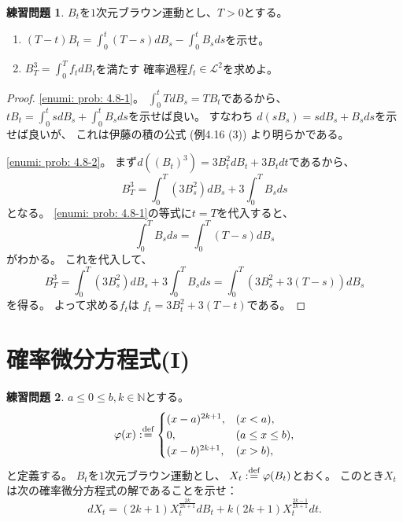 \documentclass[uplatex]{jsarticle}
\theoremstyle{definition}
\newtheorem{prob}[prob]{練習問題}
\def\N{\mathbb{N}}
\def\mcL{\mathcal{L}}
\def\dfn{:\overset{\mbox{{\scriptsize def}}}{=}}
\begin{document}
\begin{prob}\label{prob: 4.8}
  \(B_t\)を\(1\)次元ブラウン運動とし、\(T > 0\)とする。
  \begin{enumerate}
    \item \label{enumi: prob: 4.8-1}
    \((T-t)B_t = \int_0^t(T-s)dB_s - \int_0^tB_sds\)を示せ。
    \item \label{enumi: prob: 4.8-2}
    \(B_T^3 = \int_0^T f_tdB_t\)を満たす
    確率過程\(f_t\in \mcL^2\)を求めよ。
  \end{enumerate}
\end{prob}

\begin{proof}
  \ref{enumi: prob: 4.8-1}。
  \(\int_0^tTdB_s = TB_t\)であるから、
  \(tB_t = \int_0^tsdB_s + \int_0^tB_sds\)を示せば良い。
  すなわち
  \(d(sB_s) = sdB_s + B_sds\)を示せば良いが、
  これは伊藤の積の公式 (例4.16 (3)) より明らかである。

  \ref{enumi: prob: 4.8-2}。
  まず\(d((B_t)^3) = 3B_t^2dB_t + 3B_tdt\)であるから、
  \[
  B_T^3 = \int_0^T(3B_s^2)dB_s + 3\int_0^TB_sds
  \]
  となる。
  \ref{enumi: prob: 4.8-1}の等式に\(t=T\)を代入すると、
  \[
  \int_0^TB_sds = \int_0^T(T-s)dB_s
  \]
  がわかる。
  これを代入して、
  \[
  B_T^3 = \int_0^T(3B_s^2)dB_s + 3\int_0^TB_sds
  = \int_0^T(3B_s^2 + 3(T-s)) dB_s
  \]
  を得る。
  よって求める\(f_t\)は
  \(f_t = 3B_t^2 + 3(T-t)\)である。
\end{proof}















\newpage
\section{確率微分方程式(I)}
\label{section 5}


\begin{prob}\label{prob: 5.1}
  \(a\leq 0 \leq b , k\in \N\)とする。
  \[
  \varphi(x) \dfn
  \begin{cases}
    (x-a)^{2k+1}, &(x < a), \\
    0 , &(a \leq x \leq b), \\
    (x-b)^{2k+1}, &(x > b),
  \end{cases}
  \]
  と定義する。
  \(B_t\)を\(1\)次元ブラウン運動とし、
  \(X_t \dfn \varphi(B_t)\)とおく。
  このとき\(X_t\)は次の確率微分方程式の解であることを示せ：
  \[
  dX_t = (2k+1)X_t^{\frac{2k}{2k+1}}dB_t + k(2k+1)X_t^{\frac{2k-1}{2k+1}}dt.
  \]
\end{prob}
\end{document}
